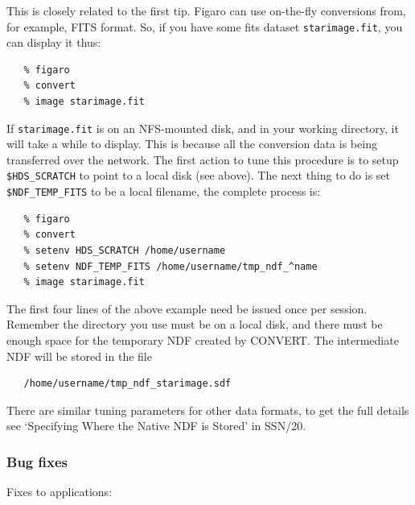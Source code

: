 \documentclass[11pt,twoside]{article}
\begin{document}
\begin{enumerate}
      This is closely related to the first tip.  Figaro can use
      on-the-fly conversions from, for example, FITS format.
      So, if you have some fits dataset \verb+starimage.fit+, you can
      display it thus:

\begin{verbatim}
   % figaro
   % convert
   % image starimage.fit
\end{verbatim}

      If \verb+starimage.fit+ is on an NFS-mounted disk, and in your
      working
      directory, it will take a while to display.  This is because all
      the conversion data is being transferred over the network.
      The first action to tune this procedure is to setup
      \verb+$HDS_SCRATCH+
      to point to a local disk (see above).  The next thing to do is
      set \verb+$NDF_TEMP_FITS+ to be a local filename,
      the complete process is:

\begin{verbatim}
   % figaro
   % convert
   % setenv HDS_SCRATCH /home/username
   % setenv NDF_TEMP_FITS /home/username/tmp_ndf_^name
   % image starimage.fit
\end{verbatim}

      The first four lines of the above example need be issued once per
      session.
      Remember the directory you use must be on a local disk, and there
      must be enough space for the temporary NDF created by CONVERT.
      The intermediate NDF will be stored in the file

\begin{verbatim}
   /home/username/tmp_ndf_starimage.sdf
\end{verbatim}

      There are similar tuning parameters for other data formats, to
      get the full details see `Specifying Where the Native NDF is
      Stored' in SSN/20.

\end{enumerate}

\subsubsection{Bug fixes}

   Fixes to applications:
\end{document}
